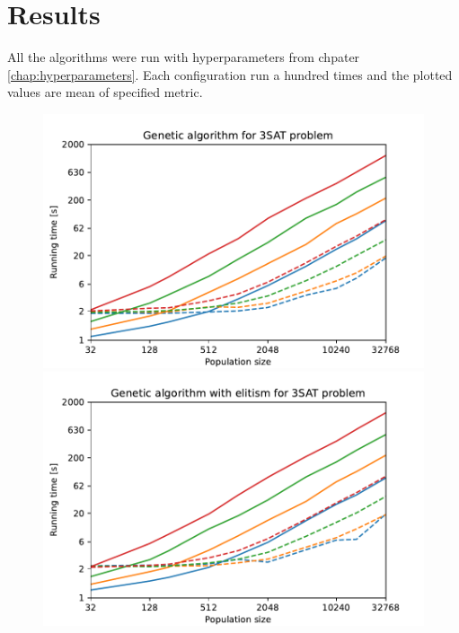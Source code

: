 \chapter{Results}

All the algorithms were run with hyperparameters from chpater \ref{chap:hyperparameters}. Each configuration run a hundred times and the plotted values are mean of specified metric.



\begin{figure}[ht!]
    \centering
    \begin{minipage}[t]{0.9\textwidth}
        \begin{minipage}[t]{0.48\textwidth}
            \includegraphics[width=\textwidth]{img/runs/time_ga.pdf}
        \end{minipage}
        \begin{minipage}[t]{0.48\textwidth}
            \includegraphics[width=\textwidth]{img/runs/time_ga_elitism.pdf}
        \end{minipage}
    \end{minipage}


\end{figure}

